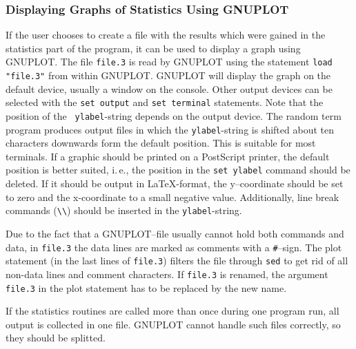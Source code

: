 \subsubsection{Displaying Graphs of Statistics Using GNUPLOT}
If the user chooses to create a file with the results which were gained
in the statistics part of the program, it can be used to display a
graph using GNUPLOT. The file {\tt file.3} is read by GNUPLOT using the
statement {\tt load "file.3"} from within GNUPLOT.  GNUPLOT will
display the graph on the default device, usually a window on the
console. Other output devices can be selected with the {\tt set output}
and {\tt set terminal} statements. Note that the position of the {\tt
ylabel}-string depends on the output device. The random term program
produces output files in which the {\tt ylabel}-string is shifted
about ten characters downwards form the default position. This is
suitable for most terminals. If a graphic should be printed on a
PostScript printer, the default position is better suited, i.\,e., the
position in the {\tt set ylabel} command should be deleted. If it should
be output in \LaTeX-format, the y--coordinate should be set to zero and
the x-coordinate to a small negative value. Additionally, line break
commands (\verb|\\|) should be inserted in the {\tt ylabel}-string.

Due to the fact that a GNUPLOT--file usually cannot hold both commands
and data, in {\tt file.3} the data lines are marked as comments with a
{\tt \#}--sign. The plot statement (in the last lines of {\tt file.3})
filters the file through {\tt sed} to get rid of all non-data lines and
comment characters. If {\tt file.3} is renamed, the argument {\tt
file.3} in the plot statement has to be replaced by the new name.

If the statistics routines are called more than once during one program
run, all output is collected in one file. GNUPLOT cannot handle such
files correctly, so they should be splitted.


